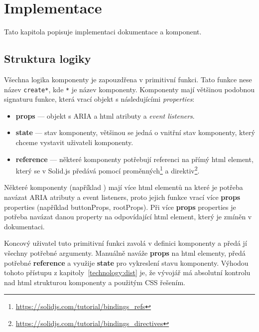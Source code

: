 \chapter{Implementace}

Tato kapitola popisuje implementaci dokumentace a komponent.

\section{Struktura logiky}\label{section:structure}

Všechna logika komponenty je zapouzdřena v primitivní funkci.
Tato funkce nese název \texttt{create*}, kde \texttt{*} je název komponenty.
Komponenty mají většinou podobnou signaturu funkce, která vrací objekt s následujícími \textit{properties}:

\begin{itemize}
    \item \textbf{props} --- objekt s ARIA a \gls{html} atributy a \textit{event listeners}.
    \item \textbf{state} --- stav komponenty, většinou se jedná o vnitřní stav komponenty, který chceme vystavit uživateli komponenty.
    \item \textbf{reference} --- některé komponenty potřebují referenci na přímý \gls{html} element, který se v Solid.js předává pomocí proměnných\footnote{\url{https://solidjs.com/tutorial/bindings_refs}} a direktiv\footnote{\url{https://solidjs.com/tutorial/bindings_directives}}.
\end{itemize}

Některé komponenty (například ) mají více \gls{html} elementů na které je potřeba navázat ARIA atributy a event listeners, proto jejich funkce vrací více \textbf{props} properties (například buttonProps, rootProps).
Při více \textbf{props} properties je potřeba navázat danou property na odpovídající \gls{html} element, který je zmíněn v dokumentaci.

Koncový uživatel tuto primitivní funkci zavolá v definici komponenty a předá jí všechny potřebné argumenty.
Manuálně naváže \textbf{props} na \gls{html} elementy, předá potřebné \textbf{reference} a využije \textbf{state} pro vykreslení stavu komponenty.
Výhodou tohoto přístupu z kapitoly~\ref{technology:dist} je, že vývojář má absolutní kontrolu nad \gls{html} strukturou komponenty a použitým CSS řešením.
\clearpage

